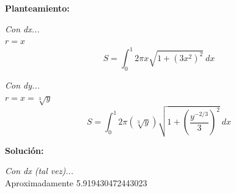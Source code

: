 \documentclass[10pt,letterpaper]{article}
\begin{document}
\begin{enumerate}
\begin{multicols}{2}

\textbf{Planteamiento:}

\textit{Con dx...} \\
$r = x$
$$S = \int_{0}^{1} 2\pi x \sqrt{1+ (3x^2)^2 }\ dx$$

\textit{Con dy...} \\
$r = x = \sqrt[3]{y}$
$$S = \int_{0}^{1} 2\pi (\sqrt[3]{y}) \sqrt{1+ (\frac{y^{-2/3}}{3})^2 }\ dx$$

\textbf{Solución:}

\textit{Con dx (tal vez)...} \\
Aproximadamente 5.919430472443023

\end{multicols}

\end{enumerate}
\end{document}
